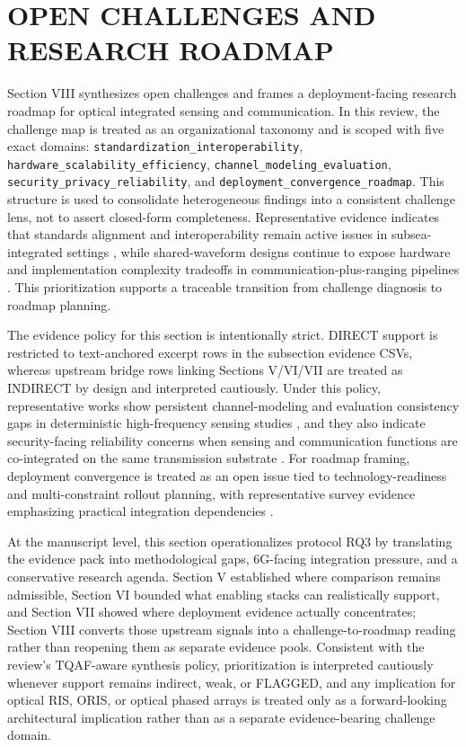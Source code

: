 \section{OPEN CHALLENGES AND RESEARCH ROADMAP}

Section VIII synthesizes open challenges and frames a deployment-facing research roadmap for optical integrated sensing and communication. In this review, the challenge map is treated as an organizational taxonomy and is scoped with five exact domains: \texttt{standardization\_interoperability}, \texttt{hardware\_scalability\_efficiency}, \texttt{channel\_modeling\_evaluation}, \texttt{security\_privacy\_reliability}, and \texttt{deployment\_convergence\_roadmap}. This structure is used to consolidate heterogeneous findings into a consistent challenge lens, not to assert closed-form completeness. Representative evidence indicates that standards alignment and interoperability remain active issues in subsea-integrated settings \cite{O_ISAC_220}, while shared-waveform designs continue to expose hardware and implementation complexity tradeoffs in communication-plus-ranging pipelines \cite{O_ISAC_035}. This prioritization supports a traceable transition from challenge diagnosis to roadmap planning.

The evidence policy for this section is intentionally strict. DIRECT support is restricted to text-anchored excerpt rows in the subsection evidence CSVs, whereas upstream bridge rows linking Sections V/VI/VII are treated as INDIRECT by design and interpreted cautiously. Under this policy, representative works show persistent channel-modeling and evaluation consistency gaps in deterministic high-frequency sensing studies \cite{O_ISAC_115}, and they also indicate security-facing reliability concerns when sensing and communication functions are co-integrated on the same transmission substrate \cite{O_ISAC_202}. For roadmap framing, deployment convergence is treated as an open issue tied to technology-readiness and multi-constraint rollout planning, with representative survey evidence emphasizing practical integration dependencies \cite{O_ISAC_163}.

At the manuscript level, this section operationalizes protocol RQ3 by translating the evidence pack into methodological gaps, 6G-facing integration pressure, and a conservative research agenda. Section V established where comparison remains admissible, Section VI bounded what enabling stacks can realistically support, and Section VII showed where deployment evidence actually concentrates; Section VIII converts those upstream signals into a challenge-to-roadmap reading rather than reopening them as separate evidence pools. Consistent with the review's TQAF-aware synthesis policy, prioritization is interpreted cautiously whenever support remains indirect, weak, or FLAGGED, and any implication for optical RIS, ORIS, or optical phased arrays is treated only as a forward-looking architectural implication rather than as a separate evidence-bearing challenge domain.

